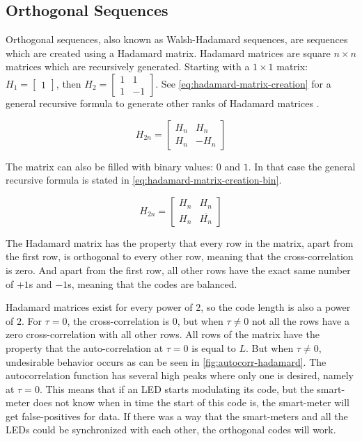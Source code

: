 
\subsection{Orthogonal Sequences}
\label{subsec:orthogonal-sequences}

Orthogonal sequences, also known as Walsh-Hadamard sequences, are sequences which are created using a Hadamard matrix.
Hadamard matrices are square $n \times n$ matrices which are recursively generated.
Starting with a $1 \times 1$ matrix: 
		$H_{1} = \begin{bmatrix} 1 \end{bmatrix}$, then 
		$H_{2} = \begin{bmatrix} 1 & 1 \\ 1 & -1 \end{bmatrix}$.
See \autoref{eq:hadamard-matrix-creation} for a general recursive formula to generate other ranks of Hadamard matrices \cite{714616}.

\begin{equation}
	H_{2n} = 
	\begin{bmatrix} 
		H_n & H_n \\ 
		H_n & -H_n 
	\end{bmatrix}
	\label{eq:hadamard-matrix-creation}
\end{equation}

The matrix can also be filled with binary values: $0$ and $1$. In that case the general recursive formula is stated in \autoref{eq:hadamard-matrix-creation-bin}. 

\begin{equation}
	H_{2n} = 
	\begin{bmatrix} 
		H_n & H_n \\ 
		H_n & \overline{H_n}
	\end{bmatrix}
	\label{eq:hadamard-matrix-creation-bin}
\end{equation}




The Hadamard matrix has the property that every row in the matrix, apart from the first row, is orthogonal to every other row, meaning that the cross-correlation is zero.
And apart from the first row, all other rows have the exact same number of $+1$s and $-1$s, meaning that the codes are balanced.

Hadamard matrices exist for every power of $2$, so the code length is also a power of $2$.
For $\tau = 0$, the cross-correlation is $0$, but when $\tau \neq 0$ not all the rows have a zero cross-correlation with all other rows.
All rows of the matrix have the property that the auto-correlation at $\tau = 0$ is equal to $L$.
But when $\tau \neq 0$, undesirable behavior occurs as can be seen in \autoref{fig:autocorr-hadamard}.
The autocorrelation function has several high peaks where only one is desired, namely at $\tau = 0$.
This means that if an LED starts modulating its code, but the smart-meter does not know when in time the start of this code is, the smart-meter will get false-positives for data.
If there was a way that the smart-meters and all the LEDs could be synchronized with each other, the orthogonal codes will work.

